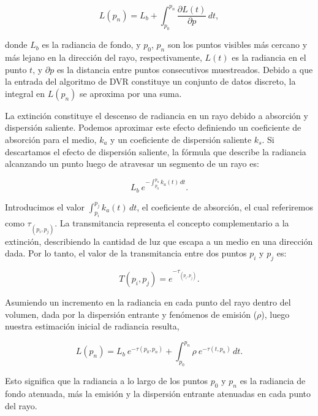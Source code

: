 \begin{equation} \label{eq:general_radiance}  
  L(p_n) = L_b + \int_{p_0}^{p_n} \frac{\partial L(t)}{\partial p} \, dt,
\end{equation}

\noindent donde $L_b$ es la radiancia de fondo, y $p_0$, $p_n$ son los puntos visibles más cercano y más lejano en la dirección del rayo, respectivamente, $L(t)$  es la radiancia en el punto $t$, y $\partial p$ es la distancia entre puntos consecutivos muestreados. 
Debido a que la entrada del algoritmo de DVR constituye un conjunto de datos discreto, la integral en $L(p_n)$ se aproxima por una suma.

La extinción constituye el descenso de radiancia en un rayo debido a absorción y dispersión saliente.
Podemos aproximar este efecto definiendo un coeficiente de absorción para el medio, $k_a$ y un coeficiente de dispersión saliente $k_s$. 
Si descartamos el efecto de dispersión saliente, la fórmula que describe la radiancia alcanzando un punto luego de atravesar un segmento de un rayo es:

\begin{equation} \label{eq:radiance_absorption}  
    L_b \ e^{- \textstyle  \int_{p_0}^{p_n} k_a(t) \, dt}.
\end{equation}

Introducimos el valor $\int_{p_i}^{p_j} k_a(t) \, dt$, el coeficiente de absorción, el cual referiremos como $\tau_{(p_i, p_j)}$. 
La transmitancia representa el concepto complementario a la extinción, describiendo la cantidad de luz que escapa a un medio en una dirección dada.
Por lo tanto, el valor de la transmitancia entre dos puntos $p_i$ y $p_j$ es:

\begin{equation} \label{eq:transmittance}  
  T(p_i,p_j) = e^{- \textstyle \tau_{(p_i, p_j)}}.
\end{equation}

Asumiendo un incremento en la radiancia en cada punto del rayo dentro del volumen, dada por la dispersión entrante y fenómenos de emisión ($\rho$), luego nuestra estimación inicial de radiancia resulta,

\begin{equation} \label{eq:ray_radiance}  
  L(p_n) = L_b \ e^{-\tau(p_0, p_n)} + \int_{p_0}^{p_n} \rho \ e^{-\tau(t,p_n)} \, dt.
\end{equation}

Esto significa que la radiancia a lo largo de los puntos $p_0$ y $p_n$ es la radiancia de fondo atenuada, más la emisión y la dispersión entrante atenuadas en cada punto del rayo.

